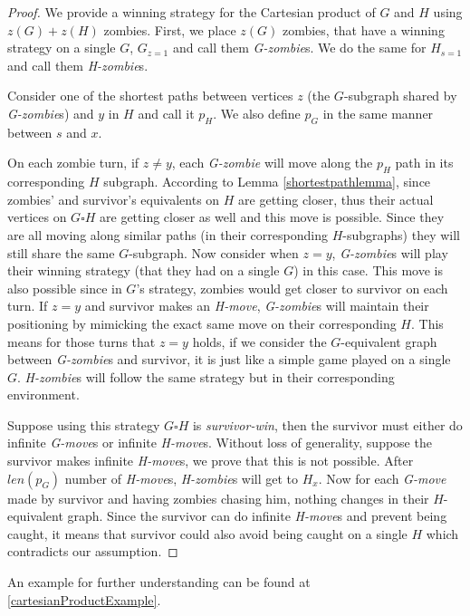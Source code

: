\documentclass[1p]{elsarticle}
\begin{document}
\begin{proof}
	We provide a winning strategy for the Cartesian product of $G$ and $H$ using $z(G)+z(H)$ zombies. First, we place
	$z(G)$ zombies, that have a winning strategy on a single $G$, $G_{z = 1}$ and call them {\it G-zombie}s. We do the
	same for $H_{s = 1}$ and call them {\it H-zombie}s.


	Consider one of the shortest paths between vertices $z$ (the $G$-subgraph shared by {\it G-zombie}s) and $y$ in $H$
	and call it $p_H$. We also define $p_G$ in the same manner between $s$ and $x$.


	On each zombie turn, if $z \neq y$, each {\it G-zombie} will move along the $p_H$ path in its corresponding $H$
	subgraph. According to Lemma \ref{shortestpathlemma}, since zombies' and survivor's equivalents on $H$ are getting
	closer, thus their actual vertices on $G \square H$ are getting closer as well and this move is possible. Since they
	are all moving along similar paths (in their corresponding $H$-subgraphs) they will still share the same
	$G$-subgraph. Now consider when $z = y$, {\it G-zombie}s will play their winning strategy (that they had on a single
	$G$) in this case. This move is also possible since in $G$'s strategy, zombies would get closer to survivor on each
	turn. If $z = y$ and survivor makes an {\it H-move}, {\it G-zombie}s will maintain their positioning by mimicking
	the exact same move on their corresponding $H$. This means for those turns that $z=y$ holds, if we consider the
	$G$-equivalent graph between {\it G-zombie}s and survivor, it is just like a simple game played on a single $G$.
	{\it H-zombie}s will follow the same strategy but in their corresponding environment.
	
	
	Suppose using this strategy $G \square H$ is {\it survivor-win}, then the survivor must either do infinite {\it
	G-move}s or infinite {\it H-move}s. Without loss of generality, suppose the survivor makes infinite {\it H-move}s,
	we prove that this is not possible. After $len(p_G)$ number of {\it H-move}s, {\it H-zombie}s will get to $H_x$. Now for
	each {\it G-move} made by survivor and having zombies chasing him, nothing changes in their $H$-equivalent graph.
	Since the survivor can do infinite {\it H-move}s and prevent being caught, it means that survivor could also avoid
	being caught on a single $H$ which contradicts our assumption.
	
\end{proof}
An example for further understanding can be found at \ref{cartesianProductExample}.
\end{document}
